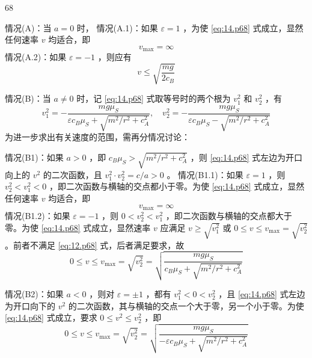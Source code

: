 \begin{solution}{68}
\begin{subsolution}
        情况(A)：当 $a=0$ 时，
        情况(A.1)：如果 $\varepsilon=1$ ，为使 \eqref{eq:14.p68} 式成立，显然任何速率 $v$ 均适合，即
        \begin{equation}
            v_{\max} = \infty \label{eq:15.p68}
        \end{equation}
        情况(A.2)：如果 $\varepsilon=-1$ ，则应有
        \begin{equation}
            v \leq \sqrt{\frac{mg}{2c_{B}}} \label{eq:16.p68}
        \end{equation}

        情况(B)：当 $a \neq 0$ 时，记 \eqref{eq:14.p68} 式取等号时的两个根为 $v_{1}^{2}$ 和 $v_{2}^{2}$ ，有
        \begin{equation}
            v_{1}^{2} = -\frac{mg\mu_{S}}{\varepsilon c_{B}\mu_{S} + \sqrt{m^{2}/r^{2} + c_{A}^{2}}},\quad v_{2}^{2} = -\frac{mg\mu_{S}}{\varepsilon c_{B}\mu_{S} - \sqrt{m^{2}/r^{2} + c_{A}^{2}}} \label{eq:17.p68}
        \end{equation}
        为进一步求出有关速度的范围，需再分情况讨论：

        情况(B1)：如果 $a > 0$ ，即 $c_{B}\mu_{S} > \sqrt{m^{2}/r^{2} + c_{A}^{2}}$ ，则 \eqref{eq:14.p68} 式左边为开口向上的 $v^{2}$ 的二次函数，且 $v_{1}^{2}\cdot v_{2}^{2} = c/a > 0$ 。
        情况(B1.1)：如果 $\varepsilon=1$ ，则 $v_{2}^{2} < v_{1}^{2} < 0$ ，即二次函数与横轴的交点都小于零。为使 \eqref{eq:14.p68} 式成立，显然任何速率 $v$ 均适合，即
        \begin{equation}
            v_{\max} = \infty \label{eq:18.p68}
        \end{equation}
        情况(B1.2)：如果 $\varepsilon=-1$ ，则 $0 < v_{2}^{2} < v_{1}^{2}$ ，即二次函数与横轴的交点都大于零。为使 \eqref{eq:14.p68} 式成立，显然速率 $v$ 应满足 $v \geq \sqrt{v_{1}^{2}}$ 或 $0 \leq v \leq v_{\max} = \sqrt{v_{2}^{2}}$ 。前者不满足 \eqref{eq:12.p68} 式，后者满足要求，故
        \begin{equation}
            0 \leq v \leq v_{\max} = \sqrt{v_{2}^{2}} = \sqrt{\frac{mg\mu_{S}}{c_{B}\mu_{S} + \sqrt{m^{2}/r^{2} + c_{A}^{2}}}} \label{eq:19.p68}
        \end{equation}

        情况(B2)：如果 $a < 0$ ，则对 $\varepsilon = \pm 1$ ，都有 $v_{1}^{2} < 0 < v_{2}^{2}$ ，且 \eqref{eq:14.p68} 式左边为开口向下的 $v^{2}$ 的二次函数，其与横轴的交点一个大于零，另一个小于零。为使 \eqref{eq:14.p68} 式成立，要求 $0 \leq v^{2} \leq v_{2}^{2}$ ，即
        \begin{equation}
            0 \leq v \leq v_{\max} = \sqrt{v_{2}^{2}} = \sqrt{\frac{mg\mu_{S}}{-\varepsilon c_{B}\mu_{S} + \sqrt{m^{2}/r^{2} + c_{A}^{2}}}} \label{eq:20.p68}
        \end{equation}


\end{subsolution}
\end{solution}
